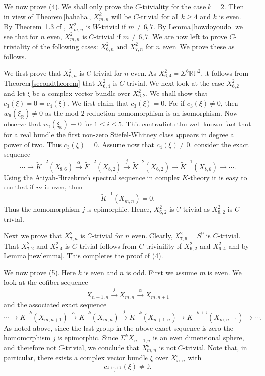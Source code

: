 \documentclass[12pt,reqno]{amsart}
\numberwithin{equation}{subsection}
\theoremstyle{definition}
\begin{document}
We now prove (4).
We shall only prove the $C$-triviality for the case $k=2$. Then in view of Theorem\,\ref{hahaha}, $X^k_{m,n}$ will be  $C$-trivial for all $k\geq 4$ and $k$ is even.  By Theorem\, 1.3   of \cite{aniajay}, $X^2_{m,n}$ is $W$-trivial if $m \neq 6,7$. By Lemma\,\ref{howdoyoudo} we see that for $n$ even, $X^2_{m,n}$ is $C$-trivial if $m \neq 6,7$. We are now left to prove $C$-triviality of the following cases: $X^2_{6,n}$ and $X^2_{7,n}$ for $n$ even. We prove these as follows.

We first prove that $X^2_{6,n}$ is $C$-trivial for $n$ even. As $X^2_{6,4}=\Sigma^6\mathbb R\mathbb P^2$, it follows from Theorem\,\ref{secondtheorem} that 
$X^2_{6,4}$ is $C$-trivial. We next look at the case $X^2_{6,2}$ and  
let $\xi$ be a complex vector bundle over $X^2_{6,2}$. We shall show that $c_3(\xi)=0=c_4(\xi)$. 
We first claim that $c_3(\xi)=0$. For if $c_3(\xi)\neq 0$, then $w_6(\xi_{\mathbb R})\neq 0$ as the mod-$2$ reduction homomorphism is an isomorphism. 
Now observe that $w_i(\xi_{\mathbb R})=0$ for $1\leq i\leq 5$. This contradicts the well-known fact that for a real bundle the first non-zero Stiefel-Whitney class appears in degree a power of two. Thus $c_3(\xi)=0$. Assume now that $c_4(\xi)\neq 0$. 
consider the exact sequence 
$$\cdots\rightarrow \widetilde{K}^{-2}(X_{8,6})\stackrel{\alpha}\longrightarrow\widetilde{K}^{-2}(X_{8,2})\stackrel{j}\longrightarrow
\widetilde{K}^{-2}(X_{6,2})\longrightarrow\widetilde{K}^{-1}(X_{8,6})\rightarrow \cdots.$$
Using the Atiyah-Hirzebruch spectral sequence in complex $K$-theory it is easy to see that if  $m$ is even, then 
$$\widetilde{K}^{-1}(X_{m,n})=0.$$ 
Thus the homomorphism $j$ is epimorphic. Hence, $X^2_{6,2}$ is $C$-trivial as $X^2_{8,2}$ is $C$-trivial. 

Next we prove that $X^2_{7,n}$ is $C$-trivial for $n$ even.  Clearly, $X^2_{7,6}=S^9$ is $C$-trivial. 
That $X^2_{7,2}$ and $X^2_{7,4}$ is $C$-trivial follows from $C$-triviaility of $X^2_{6,2}$ and $X^2_{6,4}$ and by Lemma\,\ref{newlemma}. This completes the proof of (4).  

We now prove (5). Here $k$ is even and $n$ is odd. First we assume $m$ is even. We look at the cofiber sequence 
$$X_{n+1,n}\stackrel{j}\longrightarrow X_{m,n}\stackrel{\alpha}\longrightarrow X_{m,n+1}$$
and the associated exact sequence
$$\cdots\rightarrow \widetilde{K}^{-k}(X_{m,n+1})\stackrel{\alpha}\longrightarrow\widetilde{K}^{-k}(X_{m,n})\stackrel{j}\longrightarrow
\widetilde{K}^{-k}(X_{n+1,n})\longrightarrow\widetilde{K}^{-k+1}(X_{m,n+1})\rightarrow\cdots.$$
As noted above, since the last group in the above exact sequence is zero the homomorphism $j$ is epimorphic. Since $\Sigma^kX_{n+1,n}$ is an even dimensional sphere, and therefore not $C$-trivial, we conclude that $X^k_{m,n}$ is not $C$-trivial. Note that, in particular, there exists a complex vector bundle $\xi$ over $X^k_{m,n}$ with $$c_{\frac{k+n+1}{2}}(\xi)\neq 0.$$ 
\end{document}
